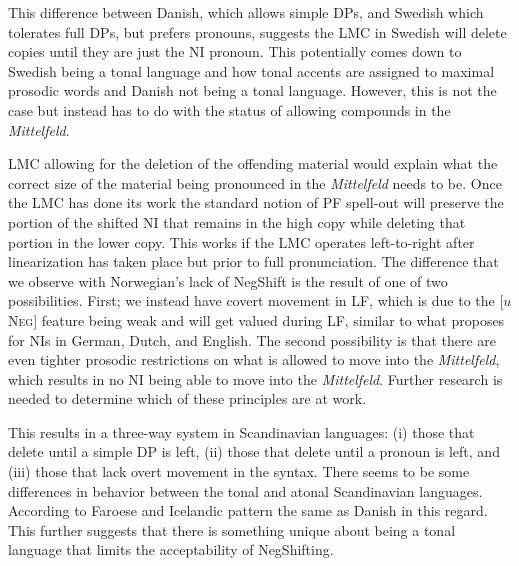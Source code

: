 \documentclass[12pt, letterpaper]{article}
\begin{document}
This difference between Danish, which allows simple DPs, and Swedish which tolerates full DPs, but prefers pronouns, suggests the LMC in Swedish will delete copies until they are just the NI pronoun. This potentially comes down to Swedish being a tonal language and how tonal accents are assigned to maximal prosodic words \citep{myrbergProsodicWordSwedish2013,myrbergProsodicHierarchySwedish2015,riadPhonologySwedish2014} and Danish not being a tonal language. However, this is not the case but instead has to do with the status of allowing compounds in the \emph{Mittelfeld}.

LMC allowing for the deletion of the offending material would explain what the correct size of the material being pronounced in the \emph{Mittelfeld} needs to be. Once the LMC has done its work the standard notion of PF spell-out will preserve the portion of the shifted NI that remains in the high copy while deleting that portion in the lower copy. This works if the LMC operates left-to-right after linearization has taken place but prior to full pronunciation. The difference that we observe with Norwegian's lack of NegShift is the result of one of two possibilities. First; we instead have covert movement in LF, which is due to the [$u$\textsc{Neg}] feature being weak and will get valued during LF, similar to what \citet{zeijlstraSyntacticallyComplexStatus2011} proposes for NIs in German, Dutch, and English. The second possibility is that there are even tighter prosodic restrictions on what is allowed to move into the \emph{Mittelfeld}, which results in no NI being able to move into the \emph{Mittelfeld}. Further research is needed to determine which of these principles are at work. 

This results in a three-way system in Scandinavian languages: (i) those that delete until a simple DP is left, (ii) those that delete until a pronoun is left, and (iii) those that lack overt movement in the syntax. There seems to be some differences in behavior between the tonal and atonal Scandinavian languages. According to \citet{thrainssonFaroeseOverviewReference2004,thrainssonSyntaxIcelandic2010} Faroese and Icelandic pattern the same as Danish in this regard. This further suggests that there is something unique about being a tonal language that limits the acceptability of NegShifting.
\end{document}
